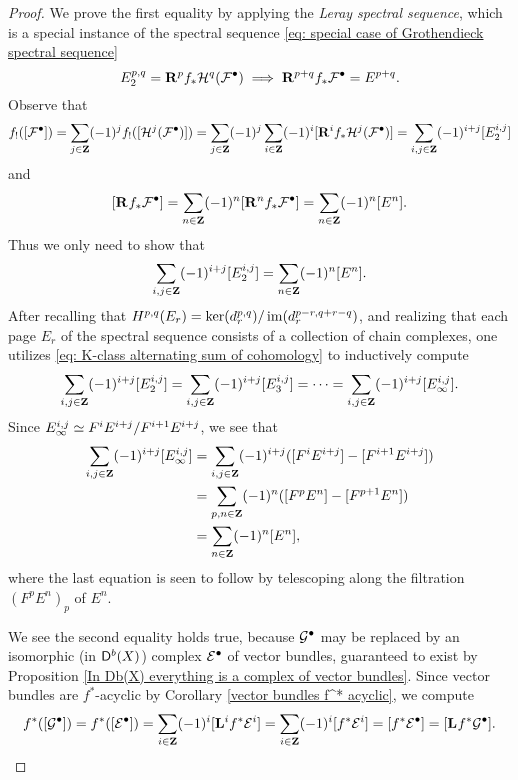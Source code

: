 \begin{proof}
    We prove the first equality by applying the \emph{Leray spectral sequence}, which is a special instance of the spectral sequence \eqref{eq: special case of Grothendieck spectral sequence}
    \[
        E^{p,q}_2 = \mathbf{R}^{p}f_*\mathcal{H}^q(\mathcal F^\bullet) \implies \mathbf{R}^{p+q}f_*\mathcal F^\bullet = E^{p+q}.
    \]
    Observe that 
    \[
        f_!([\mathcal F^\bullet]) = \sum_{j\in \mathbf Z}(-1)^j f_!([\mathcal{H}^j(\mathcal F^\bullet)]) = \sum_{j \in \mathbf Z}(-1)^j \sum_{i \in \mathbf Z}(-1)^i[\mathbf{R}^{i}f_*\mathcal{H}^j(\mathcal F^\bullet)] = \sum_{i, j \in \mathbf Z}(-1)^{i+j}[E^{i,j}_2]
    \]  
    and
    \[
        [\mathbf{R}^{}f_*\mathcal F^\bullet] = \sum_{n \in \mathbf Z}(-1)^n[\mathbf{R}^{n}f_*\mathcal F^\bullet] = \sum_{n \in \mathbf Z}(-1)^n[E^n].
    \]
    Thus we only need to show that
    \[
        \sum_{i, j \in \mathbf Z}(-1)^{i+j}[E^{i,j}_2] = \sum_{n \in \mathbf Z}(-1)^n[E^n].
    \]
    After recalling that $H^{p,q}(E_r) = \ker(d^{p,q}_r)/\operatorname{im}(d_r^{p-r, q+r-q})$, and realizing that each page $E_r$ of the spectral sequence consists of a collection of chain complexes, one utilizes \eqref{eq: K-class alternating sum of cohomology} to inductively compute 
    \[
        \sum_{i,j \in \mathbf Z}(-1)^{i+j}[E^{i,j}_2] = \sum_{i,j \in \mathbf Z}(-1)^{i+j}[E^{i,j}_3] = \cdots = \sum_{i,j \in \mathbf Z}(-1)^{i+j}[E^{i,j}_\infty]. 
    \]
    Since $E^{i,j}_\infty \simeq F^iE^{i+j}/F^{i+1}E^{i+j}$, we see that
    \begin{align*}
        \sum_{i,j \in \mathbf Z}(-1)^{i+j}[E^{i,j}_\infty] &=
        \sum_{i,j \in \mathbf Z}(-1)^{i+j}([F^{i}E^{i+j}] - [F^{i+1}E^{i+j}]) \\
        &= \sum_{p,n \in \mathbf Z}(-1)^{n}([F^{p}E^{n}] - [F^{p+1}E^{n}]) \\
        &= \sum_{n \in \mathbf Z}(-1)^n[E^n],
    \end{align*}
    where the last equation is seen to follow by telescoping along the filtration $(F^pE^n)_p$ of $E^n$.

    We see the second equality holds true, because $\mathcal G^\bullet$ may be replaced by an isomorphic (in $\mathsf{D}^b(X)$) complex $\mathcal E^\bullet$ of vector bundles, guaranteed to exist by Proposition \ref{In Db(X) everything is a complex of vector bundles}. Since vector bundles are $f^*$-acyclic by Corollary \ref{vector bundles f^* acyclic}, we compute
    \begin{equation*}
        f^*([\mathcal G^\bullet]) = f^*([\mathcal E^\bullet]) = \sum_{i \in \mathbf Z}(-1)^i[\mathbf{L}^{i}f^*\mathcal E^i] = \sum_{i \in \mathbf Z}(-1)^i[f^*\mathcal E^i] = [f^*\mathcal E^\bullet] = [\mathbf{L}^{}f^*\mathcal G^\bullet]. \qedhere
    \end{equation*}
\end{proof}

